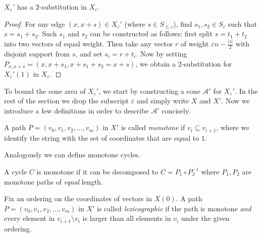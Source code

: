 \begin{claim}\label{claim:X-2-sub}
    $X_\varepsilon'$ has a $2$-substitution in $X_\varepsilon$.
\end{claim}
\begin{proof}
    For any edge $(x, x+s)\in X_\varepsilon'$ (where $s \in S_{\le \varepsilon}$), find $s_1,s_2 \in S_\varepsilon$ such that $s = s_1 + s_2$. Such $s_1$ and $s_2$ can be constructed as follows: first split \(s=t_1+t_2\) into two vectors of equal weight. Then take any vector \(r\) of weight \(\varepsilon n - \frac{|s|}{2}\) with disjoint support from \(s\), and set \(s_i=r+t_i\). Now by setting $P_{x,x+s} = (x,x+s_1, x+s_1+s_2 = x+s)$, we obtain a $2$-substitution for $X_\varepsilon'(1)$ in $X_\varepsilon$. 
\end{proof}

To bound the cone area of \(X_\varepsilon'\), we start by constructing a cone $\mathcal{A}'$ for $X_\varepsilon'$. In the rest of the section we drop the subscript $\varepsilon$ and simply write $X$ and $X'$. Now we introduce a few definitions in order to describe $\mathcal{A}'$ concisely.

\begin{definition}
    A path \(P=(v_0,v_1,v_2,\dots,v_m)\) in $X'$ is called \emph{monotone} if \(v_i \subseteq v_{i+1}\), where we identify the string with the set of coordinates that are equal to \(1\).  
\end{definition}

Analogously we can define monotone cycles.
\begin{definition}
    A cycle \(C\) is monotone if it can be decomposed to \(C = P_1 \circ P_2^{-1}\) where \(P_1,P_2\) are monotone paths of \textit{equal} length.
\end{definition}

\begin{definition}
    Fix an ordering on the coordinates of vectors in $X(0)$. A path \(P=(v_0,v_1,v_2,\dots,v_m)\) in $X'$ is called \emph{lexicographic} if the path is monotone \textit{and} every element in $v_{i+1}\setminus v_i$ is larger than all elements in $v_i$ under the given ordering.  
\end{definition}


